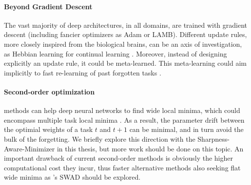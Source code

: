 \paragraph{Beyond Gradient Descent} The vast majority of deep architectures, in all domains, are
trained with gradient descent (including fancier optimizers as Adam or LAMB). Different update
rules, more closely inspired from the biological brains, can be an axis of investigation, as Hebbian
learning for continual learning \citep{taylor2020hebbiancontinual}. Moreover, instead of designing
explicitly an update rule, it could be meta-learned. This meta-learning could aim implicitly to
fast re-learning of past forgotten tasks \citep{he2019metacontinual,caccia2020osaka}.


\paragraph{Second-order optimization} methods can help deep neural networks to find wide local
minima, which could encompass multiple task local minima \citep{lee2020kroneckercontinual}. As a
result, the parameter drift between the optimial weights of a task $t$ and $t+1$ can be minimal, and
in turn avoid the bulk of the forgetting. We briefly explore this direction with the
Sharpness-Aware-Minimizer \citep{foret2020sam} in this thesis, but more work should be done on this
topic. An important drawback of current second-order methods is obviously the higher computational
cost they incur, thus faster alternative methods also seeking flat wide minima as
\citet{cha2021swad}'s SWAD should be explored.

